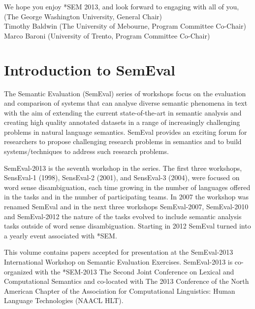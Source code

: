 We hope you enjoy *SEM 2013, and look forward to engaging with all of you, \\[2ex]



 (The George Washington University, General Chair)\\
Timothy Baldwin (The University of Mebourne, Program Committee Co-Chair)\\
Marco Baroni (University of Trento, Program Committee Co-Chair)\\


\newpage

\section*{Introduction to SemEval}\vspace{2em}

The Semantic Evaluation (SemEval) series of workshops focus on the evaluation and comparison of systems that can analyse diverse semantic phenomena in text with the aim of extending the current state-of-the-art in semantic analysis and creating high quality annotated datasets in a range of increasingly challenging problems in natural language semantics.  SemEval provides an exciting forum for researchers to propose challenging research problems in semantics and to build systems/techniques to address such research problems.

SemEval-2013 is the seventh workshop in the series.  The first three workshops, SensEval-1 (1998), SensEval-2 (2001), and SensEval-3 (2004), were focused on word sense disambiguation, each time growing in the number of languages offered in the tasks and in the number of participating teams. In 2007 the workshop was renamed SemEval and in the next three workshops SemEval-2007, SemEval-2010 and SemEval-2012 the nature of the tasks evolved to include semantic analysis tasks outside of word sense disambiguation.  Starting in 2012 SemEval turned into a yearly event associated with *SEM.

This volume contains papers accepted for presentation at the SemEval-2013 International Workshop on Semantic Evaluation Exercises. SemEval-2013 is co-organized with the *SEM-2013 The Second Joint Conference on Lexical and Computational Semantics and co-located with The 2013 Conference of the North American Chapter of the Association for Computational Linguistics: Human Language Technologies (NAACL HLT).

